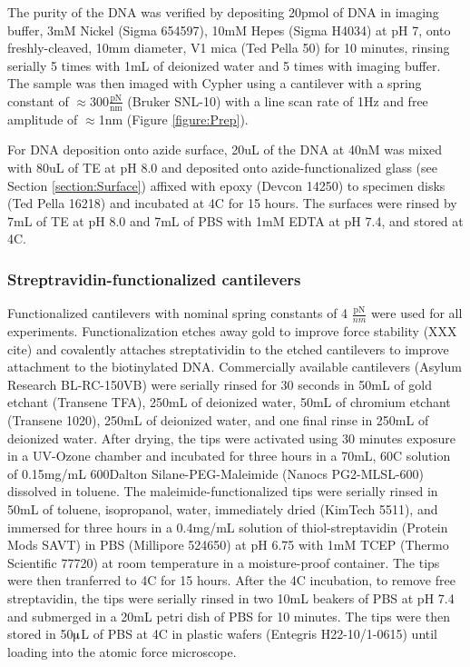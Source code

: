 \documentclass[%
  aip,12pt,tightenlines,
  amsthm,
 amsmath,amssymb
]{article}
\newcommand{\fRef}[1]{Figure \ref{figure:#1}}
\newcommand{\sRef}[1]{Section \ref{section:#1}}
\newcommand{\sLabel}[1]{\label{section:#1}}
\newcommand{\firstp}[0]{}
\newcommand{\pl}[0]{\vspace{6pt}}
\newcommand{\supply}[2]{(#1 #2)}
\newcommand{\degreeC}[0]{\degree{}C}
\begin{document}
The purity of the DNA was verified by depositing 20pmol of DNA in imaging buffer, 3mM Nickel \supply{Sigma}{654597}, 10mM Hepes \supply{Sigma}{H4034} at pH 7, onto freshly-cleaved, 10mm diameter, V1 mica \supply{Ted Pella}{50} for 10 minutes, rinsing serially 5 times with 1mL of deionized water and 5 times with imaging buffer. The sample was then imaged with Cypher using a cantilever with a spring constant of $\approx 300 \frac{\text{pN}}{\text{nm}}$ \supply{Bruker}{SNL-10} with a line scan rate of 1Hz and free amplitude of $\approx$1nm (\fRef{Prep}).\pl 

For DNA deposition onto azide surface, 20uL of the DNA at 40nM was mixed with 80uL of TE at pH 8.0 and deposited onto azide-functionalized glass (see \sRef{Surface}) affixed with epoxy \supply{Devcon}{14250} to specimen disks \supply{Ted Pella}{16218} and incubated at 4C for 15 hours. The surfaces were rinsed by 7mL of TE at pH 8.0 and 7mL of PBS with 1mM EDTA at pH 7.4, and stored at 4\degreeC{}. 

\subsubsection{\sLabel{Cantilevers}Streptravidin-functionalized cantilevers}

\firstp Functionalized cantilevers with nominal spring constants of 4 $\frac{\text{pN}}{nm}$  were used for all experiments. Functionalization etches away gold to improve force stability (XXX cite) and covalently attaches streptatividin to the etched cantilevers to improve attachment to the biotinylated DNA. Commercially available cantilevers \supply{Asylum Research}{BL-RC-150VB} were serially rinsed for 30 seconds in 50mL of gold etchant \supply{Transene}{TFA}, 250mL of deionized water, 50mL of chromium etchant \supply{Transene}{1020}, 250mL of deionized water, and one final rinse in 250mL of deionized water. After drying, the tips were activated using 30 minutes exposure in a UV-Ozone chamber and incubated for three hours in a 70mL, 60\degreeC{} solution of 0.15mg/mL 600Dalton Silane-PEG-Maleimide \supply{Nanocs}{PG2-MLSL-600} dissolved in toluene. The maleimide-functionalized tips were serially rinsed in 50mL of toluene, isopropanol, water, immediately dried \supply{KimTech}{5511}, and immersed for three hours in a 0.4mg/mL solution of thiol-streptavidin \supply{Protein Mods}{SAVT} in PBS \supply{Millipore}{524650} at pH 6.75 with 1mM TCEP \supply{Thermo Scientific}{77720} at room temperature in a moisture-proof container. The tips were then tranferred to 4\degreeC{} for 15 hours. After the 4\degreeC{} incubation, to remove free streptavidin, the tips were serially rinsed in two 10mL beakers of PBS at pH 7.4 and submerged in a 20mL petri dish of PBS for 10 minutes. The tips were then stored in 50$\muup$L of PBS at 4C in plastic wafers \supply{Entegris}{H22-10/1-0615} until loading into the atomic force microscope. \pl
\end{document}
